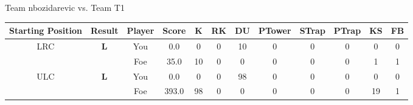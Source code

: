 \documentclass[a4paper,12pt]{article}
\begin{document}
  \vspace*{2em}
  \par {\large {\color{Gray} Team} nbozidarevic {\color{Gray}
      vs. Team} T1}
  \newline
  \begin{tabular}[t]{| c | c | c | c | c | c | c | c | c | c | c | c
      |}
    \hline
    Starting Position & \textbf{Result} & Player & \textbf{Score} & K & RK & DU & PTower & STrap & PTrap & KS & FB \\
    
      
                      
      
                      
      
                      
      
        \hline
        \multirow{2}{*}{  LRC
             } &
              \multirow{2}{*}{  \textbf{L}  } & 
                    \cellcolor{yellow!25} You & \cellcolor{yellow!25} 0.0 & \cellcolor{yellow!25} 0 &
                    \cellcolor{yellow!25} 0 & \cellcolor{yellow!25} 10 & \cellcolor{yellow!25} 0 &
                    \cellcolor{yellow!25} 0 & \cellcolor{yellow!25} 0 & \cellcolor{yellow!25} 0 &
                    \cellcolor{yellow!25} 0 \\
                    \cline{3-12}
                    & & \cellcolor{red!15} Foe & \cellcolor{red!15} 35.0 & \cellcolor{red!15} 10 & \cellcolor{red!15}
                    0 & \cellcolor{red!15} 0
                    & \cellcolor{red!15} 0 & \cellcolor{red!15}
                    0 & \cellcolor{red!15} 0 
                    & \cellcolor{red!15} 1 & \cellcolor{red!15}
                    1 \\
                    
                      
      
                      
      
                      
      
                      
      
                      
      
                      
      
        \hline
        \multirow{2}{*}{  ULC  } &
              \multirow{2}{*}{  \textbf{L}  } & 
                    \cellcolor{yellow!25} You & \cellcolor{yellow!25} 0.0 & \cellcolor{yellow!25} 0 &
                    \cellcolor{yellow!25} 0 & \cellcolor{yellow!25} 98 & \cellcolor{yellow!25} 0 &
                    \cellcolor{yellow!25} 0 & \cellcolor{yellow!25} 0 & \cellcolor{yellow!25} 0 &
                    \cellcolor{yellow!25} 0 \\
                    \cline{3-12}
                    & & \cellcolor{red!15} Foe & \cellcolor{red!15} 393.0 & \cellcolor{red!15} 98 & \cellcolor{red!15}
                    0 & \cellcolor{red!15} 0
                    & \cellcolor{red!15} 0 & \cellcolor{red!15}
                    0 & \cellcolor{red!15} 0 
                    & \cellcolor{red!15} 19 & \cellcolor{red!15}
                    1 \\
                    

\end{tabular}
\end{document}

